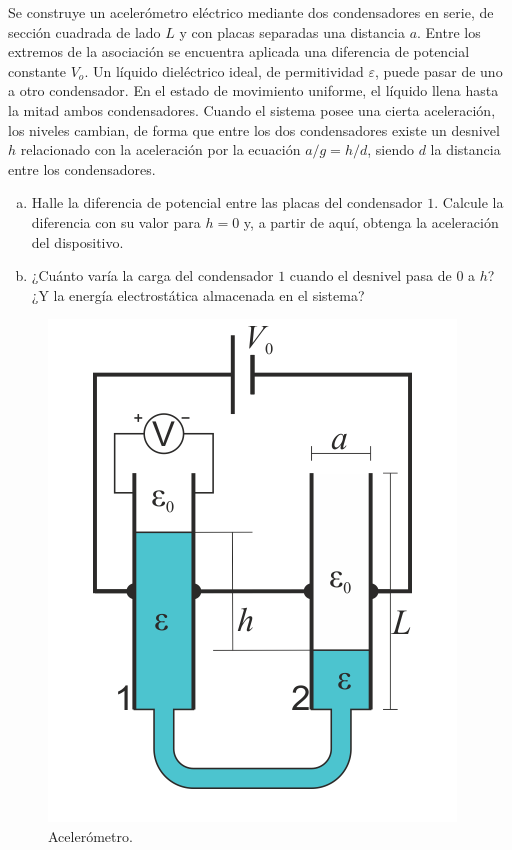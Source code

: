 \begin{mdframed}[style=warning]
	\begin{ejercicio}
		Se construye un acelerómetro eléctrico mediante dos condensadores en serie, de sección cuadrada de lado $L$ y con placas separadas una distancia $a$. Entre los extremos de la asociación se encuentra aplicada una diferencia de potencial constante $V_o$. Un líquido dieléctrico ideal, de permitividad $\varepsilon$, puede pasar de uno a otro condensador. En el estado de movimiento uniforme, el líquido llena hasta la mitad ambos condensadores. Cuando el sistema posee una cierta aceleración, los niveles cambian, de forma que entre los dos condensadores existe un desnivel $h$ relacionado con la aceleración por la ecuación $a/g = h/d$, siendo $d$ la distancia entre los condensadores.
		\begin{enumerate}[a)]
			\item Halle la diferencia de potencial entre las placas del condensador $1$. Calcule la diferencia con su valor para $h = 0$ y, a partir de aquí, obtenga la aceleración del dispositivo.
			\item ¿Cuánto varía la carga del condensador $1$ cuando el desnivel pasa de $0$ a $h$? ¿Y la energía electrostática almacenada en el sistema?
		\end{enumerate}
		\begin{figure}[H]
			\centering
			\includegraphics[scale=0.25]{./img/acelerometro.png}
			\caption{Acelerómetro.}
			\label{ej3}
		\end{figure}
	\end{ejercicio}
\end{mdframed}
